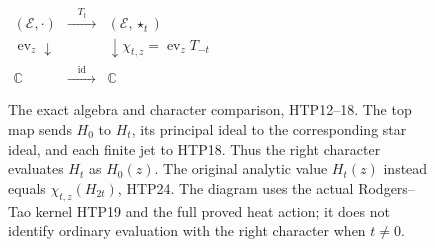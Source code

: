 \begin{figure}[ht]
\centering
$\begin{array}{ccc}
 (\mathcal E,\cdot)&\xrightarrow{\quad T_t\quad}&(\mathcal E,\star_t)\\[3pt]
 {\scriptstyle\operatorname{ev}_z}\downarrow&&
                       \downarrow{\scriptstyle\chi_{t,z}=\operatorname{ev}_zT_{-t}}\\[3pt]
 \mathbb C&\xrightarrow{\quad\operatorname{id}\quad}&\mathbb C
 \end{array}$
\caption{The exact algebra and character comparison, HTP12--18.
The top map sends $H_0$ to $H_t$, its principal ideal to the
corresponding star ideal, and each finite jet to HTP18. Thus
the right character evaluates $H_t$ as $H_0(z)$.
The original analytic value $H_t(z)$ instead equals
$\chi_{t,z}(H_{2t})$, HTP24. The diagram uses the actual
Rodgers--Tao kernel HTP19 and the full proved heat action;
it does not identify ordinary evaluation with the right
character when $t\ne0$.}
\end{figure}
